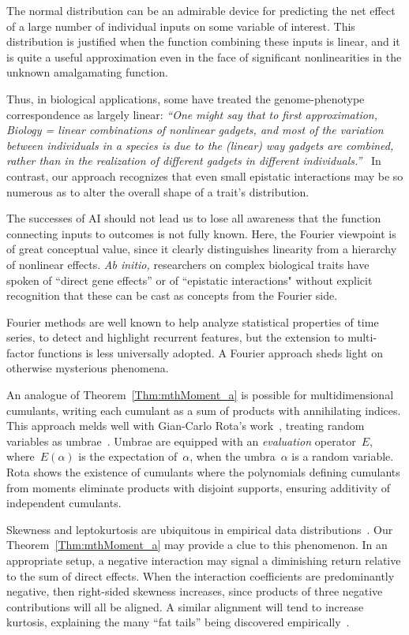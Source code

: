 \documentclass[letterpaper,11pt]{article}
\newcommand{\gr}[1]{( #1 )}
\theoremstyle{definition} \newtheorem{remark}{Remark}
\begin{document}
The normal distribution can be an admirable device for predicting the net effect of a large number of individual inputs on some variable of interest. This distribution is justified when the function combining these inputs is linear, and it is quite a useful approximation even in the face of significant nonlinearities in the unknown amalgamating function.

Thus, in biological applications, some have treated the genome-phenotype correspondence as largely linear: \emph{``One might say that to first approximation, Biology = linear combinations of nonlinear gadgets, and most of the variation between individuals in a species is due to the (linear) way gadgets are combined, rather than in the realization of different gadgets in different individuals.''}~\cite{raben2022polygenicPrediction}
In contrast, our approach recognizes that even small epistatic interactions may be so numerous as to alter the overall shape of a trait's distribution.

The successes of AI should not lead us to lose all awareness that the function connecting inputs to outcomes is not fully known. Here, the Fourier viewpoint is of great conceptual value, since it clearly distinguishes linearity from a hierarchy of nonlinear effects. \emph{Ab initio,} researchers on complex biological traits have spoken of ``direct gene effects'' or of ``epistatic interactions" without explicit recognition that these can be cast as concepts from the Fourier side.

Fourier methods are well known to help analyze statistical properties of time series, to detect and highlight recurrent features, but the extension to multi-factor functions is less universally adopted. A Fourier approach sheds light on otherwise mysterious phenomena.

An analogue of Theorem~\ref{Thm:mthMoment_a} is possible for multidimensional cumulants, writing each cumulant as a sum of products with annihilating indices. This approach melds well with Gian-Carlo Rota's work~\cite{rota2000combinatoricsCumulants}, treating random variables as umbrae~\cite{rota2001twelveProblemsProbability}. Umbrae are equipped with an \emph{evaluation} operator~$E$, where~$E\gr{\alpha}$ is the expectation of~$\alpha$, when the umbra~$\alpha$ is a random variable. Rota shows the existence of cumulants where the polynomials defining cumulants from moments eliminate products with disjoint supports, ensuring additivity of independent cumulants.

Skewness and leptokurtosis are ubiquitous in empirical data distributions~\cite{taleb2023statistical}. Our Theorem~\ref{Thm:mthMoment_a} may provide a clue to this phenomenon.  In an appropriate setup, a negative interaction may signal a diminishing return relative to the sum of direct effects. When the interaction coefficients are predominantly negative, then right-sided skewness increases, since products of three negative contributions will all be aligned. A similar alignment will tend to increase kurtosis, explaining the many ``fat tails'' being discovered empirically~\cite{doro2026submodularityFourier}.
\end{document}
